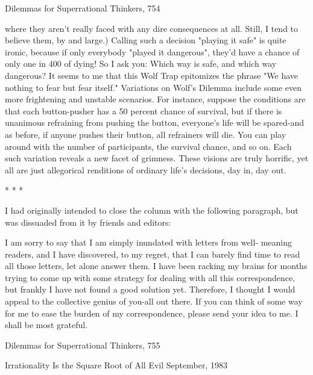 Dilemmas for Superrational Thinkers,                                                754

where they aren't really faced with any dire consequences at all. Still, I tend to believe
them, by and large.) Calling such a decision "playing it safe" is quite ironic, because if
only everybody "played it dangerous", they'd have a chance of only one in 400 of
dying! So I ask you: Which way is safe, and which way dangerous? It seems to me
that this Wolf Trap epitomizes the phrase "We have nothing to fear but fear itself."
        Variations on Wolf's Dilemma include some even more frightening and
unstable scenarios. For instance, suppose the conditions are that each button-pusher
has a 50 percent chance of survival, but if there is unanimous refraining from pushing
the button, everyone's life will be spared-and as before, if anyone pushes their button,
all refrainers will die. You can play around with the number of participants, the
survival chance, and so on. Each such variation reveals a new facet of grimness.
These visions are truly horrific, yet all are just allegorical renditions of ordinary life's
decisions, day in, day out.

                                         *   *   *

       I had originally intended to close the column with the following paragraph, but
was dissuaded from it by friends and editors:

          I am sorry to say that I am simply inundated with letters from well-
   meaning readers, and I have discovered, to my regret, that I can barely find time
   to read all those letters, let alone answer them. I have been racking my brains
   for months trying to come up with some strategy for dealing with all this
   correspondence, but frankly I have not found a good solution yet. Therefore, I
   thought I would appeal to the collective genius of you-all out there. If you can
   think of some way for me to ease the burden of my correspondence, please send
   your idea to me. I shall be most grateful.




Dilemmas for Superrational Thinkers,                                                   755


                           Irrationality Is the
                         Square Root of All Evil
                                    September, 1983


